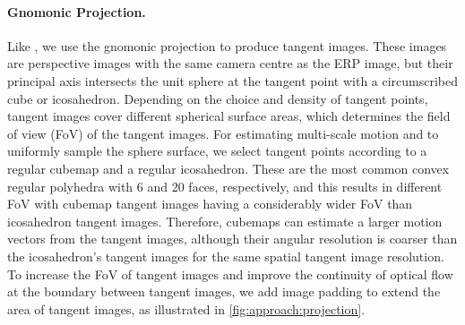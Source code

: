 \paragraph{Gnomonic Projection.}
%
Like \citet{ZhaoYZLBT2020}, we use the gnomonic projection to produce tangent images.
These images are perspective images with the same camera centre as the ERP image, but their principal axis intersects the unit sphere at the tangent point with a circumscribed cube or icosahedron.
%
Depending on the choice and density of tangent points, tangent images cover different spherical surface areas, which determines the field of view (FoV) of the tangent images.
%
For estimating multi-scale motion and to uniformly sample the sphere surface, we select tangent points according to a regular cubemap and a regular icosahedron.
These are the most common convex regular polyhedra with 6 and 20 faces, respectively, and this results in different FoV with cubemap tangent images having a considerably wider FoV than icosahedron tangent images.
%
Therefore, cubemaps can estimate a larger motion vectors from the tangent images, although their angular resolution is coarser than the icosahedron's tangent images for the same spatial tangent image resolution.
%
To increase the FoV of tangent images and improve the continuity of optical flow at the boundary between tangent images, we add image padding to extend the area of tangent images, as illustrated in \cref{fig:approach:projection}.


